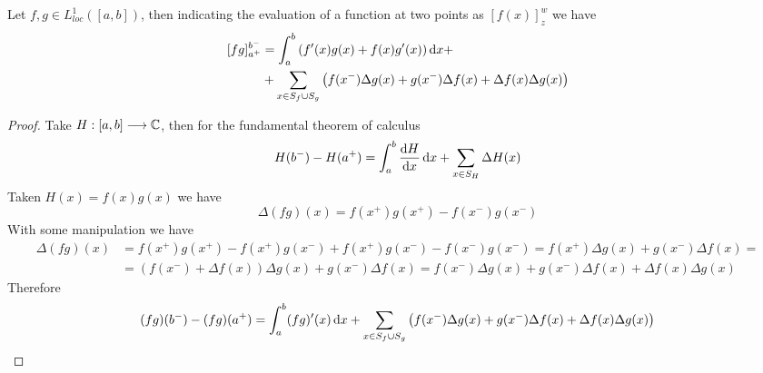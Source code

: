 \documentclass[../complete.tex]{subfiles}
\begin{document}
\begin{thm}
	Let $f,g\in L^1_{loc}([a,b])$, then indicating the evaluation of a function at two points as $[f(x)]_z^w$ we have
	\begin{equation}
		\begin{aligned}
			[fg]_{a^+}^{b^-}&=\int_{a}^{b}\left( f'(x)g(x)+f(x)g'(x) \right)\diff x+\\
			&+\sum_{x\in S_{f}\cup S_{g}}\left( f(x^-)\Delta g(x)+ g(x^-)\Delta f(x)+\Delta f(x)\Delta g(x) \right)
		\end{aligned}
		\label{eq:localpartint}
	\end{equation}
\end{thm}
\begin{proof}
	Take $H:[a,b]\overset{}{\longrightarrow}\mathbb{C}$, then for the fundamental theorem of calculus
	\begin{equation*}
		H(b^-)-H(a^+)=\int_{a}^{b}\derivative{H}{x}\diff x+\sum_{x\in S_H}\Delta H(x)
	\end{equation*}
	Taken $H(x)=f(x)g(x)$ we have
	\begin{equation*}
		\Delta(fg)(x)=f(x^+)g(x^+)-f(x^-)g(x^-)
	\end{equation*}
	With some manipulation we have
	\begin{equation*}
		\begin{aligned}
			\Delta(fg)(x)&=f(x^+)g(x^+)-f(x^+)g(x^-)+f(x^+)g(x^-)-f(x^-)g(x^-)=f(x^+)\Delta g(x)+g(x^-)\Delta f(x)=\\
			&=\left( f(x^-)+\Delta f(x) \right)\Delta g(x)+g(x^-)\Delta f(x)=f(x^-)\Delta g(x)+g(x^-)\Delta f(x)+\Delta f(x)\Delta g(x)
		\end{aligned}
	\end{equation*}
	Therefore
	\begin{equation*}
		(fg)(b^-)-(fg)(a^+)=\int_{a}^{b}(fg)'(x)\operatorname{d\!} x+\sum_{x\in S_f\cup S_g}\left( f(x^-)\Delta g(x)+g(x^-)\Delta f(x)+\Delta f(x)\Delta g(x) \right)
	\end{equation*}
\end{proof}
\end{document}
